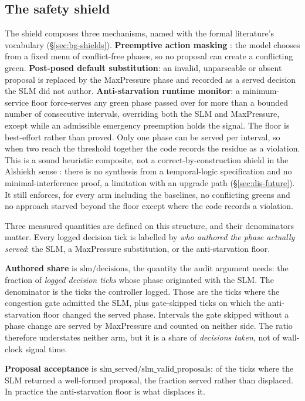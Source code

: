 \subsection{The safety shield}\label{sec:des-shield}
The shield composes three mechanisms, named with the formal literature's
vocabulary (\S\ref{sec:bg-shields}). \textbf{Preemptive action masking}
\cite{huang2020masking}: the model chooses from a fixed menu of
conflict-free phases, so no proposal can create a conflicting green.
\textbf{Post-posed default substitution}: an invalid, unparseable or absent
proposal is replaced by the MaxPressure phase and recorded as a served
decision the SLM did not author. \textbf{Anti-starvation runtime
monitor}: a minimum-service floor force-serves any green phase passed over
for more than a bounded number of consecutive intervals, overriding both
the SLM and MaxPressure, except while an admissible emergency preemption
holds the signal. The floor is best-effort rather than proved. Only one
phase can be served per interval, so when two reach the threshold together
the code records the residue as a violation. This is a sound heuristic
composite, not a correct-by-construction shield in the Alshiekh sense
\cite{alshiekh2018shield}: there is no synthesis from a temporal-logic
specification and no minimal-interference proof, a limitation with an
upgrade path (\S\ref{sec:dis-future}). It still enforces, for every arm
including the baselines, no conflicting greens and no approach starved
beyond the floor except where the code records a violation.

Three measured quantities are defined on this structure, and their
denominators matter. Every logged decision tick is labelled by \emph{who
authored the phase actually served}: the SLM, a MaxPressure substitution,
or the anti-starvation floor.

\textbf{Authored share} is $\mathrm{slm}/\mathrm{decisions}$, the quantity
the audit argument needs: the fraction of \emph{logged decision ticks}
whose phase originated with the SLM. The denominator is the ticks the
controller logged. Those are the ticks where the congestion gate admitted
the SLM, plus gate-skipped ticks on which the anti-starvation floor changed
the served phase. Intervals the gate skipped without a phase change are
served by MaxPressure and counted on neither side. The ratio therefore
understates neither arm, but it is a share of \emph{decisions taken}, not
of wall-clock signal time.

\textbf{Proposal acceptance} is
$\mathrm{slm\_served}/\allowbreak\mathrm{slm\_valid\_proposals}$: of the
ticks where the SLM returned a well-formed proposal, the fraction served
rather than displaced. In practice the anti-starvation floor is what
displaces it.

